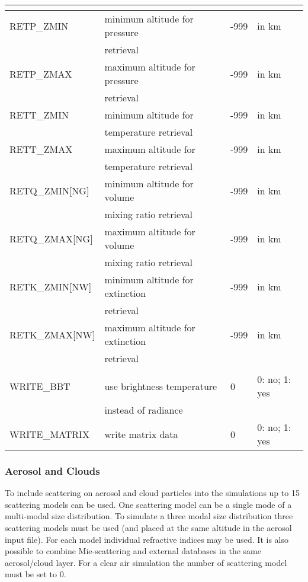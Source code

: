 \begin{table*}[!p]
{\begin{tabular}{|l|l|l|l|}
\multicolumn{4}{l}{\cellcolor[RGB]{255,204,230}{Retrieval interface}} \\
\hline
RETP\_ZMIN     & minimum altitude for pressure   & -999 & in km \\
               & retrieval                       &      & \\
RETP\_ZMAX     & maximum altitude for pressure   & -999 & in km \\
               & retrieval                       &      & \\
RETT\_ZMIN     & minimum altitude for            & -999 & in km \\
               & temperature retrieval           &      & \\
RETT\_ZMAX     & maximum altitude for            & -999 & in km \\
               & temperature retrieval           &      & \\
RETQ\_ZMIN[NG] & minimum altitude for volume     & -999 & in km \\
               & mixing ratio retrieval          &      & \\
RETQ\_ZMAX[NG] & maximum altitude for volume     & -999 & in km \\
               & mixing ratio retrieval          &      & \\
RETK\_ZMIN[NW] & minimum altitude for extinction & -999 & in km \\
               & retrieval                       &      & \\
RETK\_ZMAX[NW] & maximum altitude for extinction & -999 & in km \\
               & retrieval                       &      & \\
\hline
\hline

\multicolumn{4}{l}{\cellcolor[RGB]{255,204,230}{Output flags}} \\
\hline
WRITE\_BBT     & use brightness temperature   & 0  & 0: no; 1: yes  \\
               & instead of radiance          &    & \\   
WRITE\_MATRIX  & write matrix data            & 0  & 0: no; 1: yes  \\
\hline
\end{tabular}}
\label{tab:Control2}
\end{table*}

\subsubsection{Aerosol and Clouds}
To include scattering on aerosol and cloud particles into the simulations up to 15 scattering models can be used. One scattering model can be a single mode of a multi-modal size distribution. To simulate a three modal size distribution three scattering models must be used (and placed at the same altitude in the aerosol input file). For each model individual refractive indices may be used. It is also possible to combine Mie-scattering and external databases in the same aerosol/cloud layer. For a clear air simulation the number of scattering model must be set to 0.

